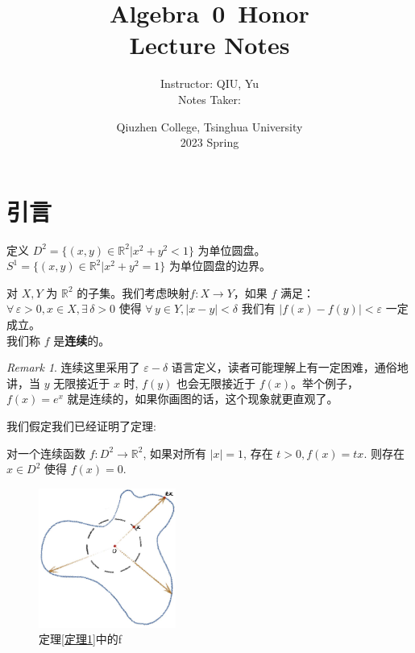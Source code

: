 \documentclass[UTF8,oneside,11pt]{book}
\title{
    \huge{Algebra~0~Honor\\Lecture Notes}
    \vspace{0.4\paperheight}
}
\author{
    \Large{Instructor: QIU, Yu}\\
    \Large{Notes Taker: }
    \vspace{0.1\paperheight}
}
\date{
    \Large{Qiuzhen College, Tsinghua University}\\
    \Large{2023 Spring}
}
\theoremstyle{plain}\newtheorem{thm}{Theorem}
\theoremstyle{definition}\newtheorem{defn}[thm]{Definition}
\theoremstyle{plain}\newtheorem{axiom}[thm]{Axiom}
\theoremstyle{plain}\newtheorem{coro}[thm]{Corollary}
\theoremstyle{plain}\newtheorem{lemma}[thm]{Lemma}
\theoremstyle{plain}\newtheorem{prop}[thm]{Proposition}
\theoremstyle{plain}\newtheorem{conj}[thm]{Conjecture}
\theoremstyle{plain}\newtheorem{ques}[thm]{Problem}
\theoremstyle{plain}\newtheorem{const}[thm]{Construction}
\theoremstyle{remark}\newtheorem{notation}[thm]{Notation}
\theoremstyle{plain}\newtheorem*{app}{Application}
\theoremstyle{plain}\newtheorem*{exam}{Example}
\theoremstyle{plain}\newtheorem*{exer}{Exercise}
\theoremstyle{remark}\newtheorem*{remark}{Remark}
\theoremstyle{remark}\newtheorem*{note}{\small{Note}}
\numberwithin{equation}{section}
\numberwithin{thm}{section}
\begin{document}
\maketitle
\frontmatter
\tableofcontents
\newpage

\section{引言}
定义 $ D^2=\{(x,y)\in\mathbb{R}^2|x^2+y^2<1\} $ 为单位圆盘。 $ S^1=\{(x,y)\in\mathbb{R}^2|x^2+y^2=1\} $ 为单位圆盘的边界。 
\begin{definition}
    对 $ X,Y  $ 为 $ \mathbb{R}^2 $ 的子集。我们考虑映射$ f:X\rightarrow Y $，如果 $ f  $ 满足：\\ $ \forall \,\varepsilon>0,x\in 
    X,\exists\, \delta>0  $ 使得  $ \forall \,y\in Y,|x-y|<\delta  $ 我们有 $  |f(x)-f(y)|<\varepsilon $ 一定成立。\\我们称 $ f  $ 是\textbf{连续}的。
\end{definition}
\begin{remark}
    连续这里采用了 $ \varepsilon-\delta  $ 语言定义，读者可能理解上有一定困难，通俗地讲，当 $ y $ 无限接近于 $ x $ 时, $ f(y) $ 也会无限接近于 $ f(x) $。举个例子， $ f(x)=e^x  $ 就是连续的，如果你画图的话，这个现象就更直观了。 
\end{remark}
我们假定我们已经证明了定理:
\begin{theorem}[二维空间的零点存在定理]\label{定理1}
    对一个连续函数 $ f:D^2\rightarrow \mathbb{R}^2  $, 如果对所有 $ |x|=1 $, 存在 $ t>0,f(x)=tx $. 则存在 $ x\in D^2 $ 使得 $ f(x)=0 $. 
\end{theorem}


\begin{figure}[htb]
    \centering
    \includegraphics[width=0.4\textwidth]{拓扑学-课本.jpg}
    \caption{定理\ref{定理1}中的f}
    \label{定理中的f}
\end{figure}
\end{document}
